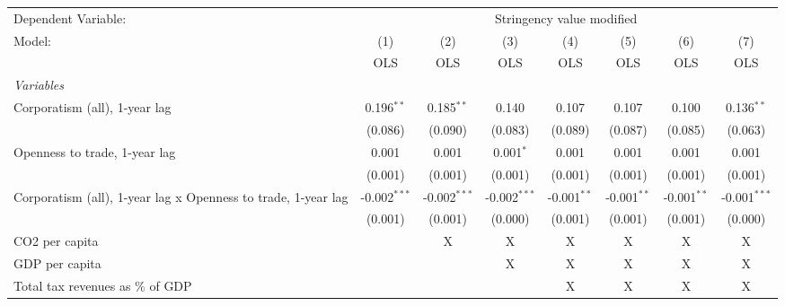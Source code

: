 
\begingroup
\centering
\begin{tabular}{lccccccc}
   \toprule
   Dependent Variable: & \multicolumn{7}{c}{Stringency value modified}\\
   Model:                                                        & (1)            & (2)            & (3)            & (4)           & (5)           & (6)           & (7)\\  
                                                                 &  OLS           & OLS            & OLS            & OLS           & OLS           & OLS           & OLS\\  
   \midrule
   \emph{Variables}\\
   Corporatism (all), 1-year lag                                 & 0.196$^{**}$   & 0.185$^{**}$   & 0.140          & 0.107         & 0.107         & 0.100         & 0.136$^{**}$\\   
                                                                 & (0.086)        & (0.090)        & (0.083)        & (0.089)       & (0.087)       & (0.085)       & (0.063)\\   
   Openness to trade, 1-year lag                                 & 0.001          & 0.001          & 0.001$^{*}$    & 0.001         & 0.001         & 0.001         & 0.001\\   
                                                                 & (0.001)        & (0.001)        & (0.001)        & (0.001)       & (0.001)       & (0.001)       & (0.001)\\   
   Corporatism (all), 1-year lag x Openness to trade, 1-year lag & -0.002$^{***}$ & -0.002$^{***}$ & -0.002$^{***}$ & -0.001$^{**}$ & -0.001$^{**}$ & -0.001$^{**}$ & -0.001$^{***}$\\   
                                                                 & (0.001)        & (0.001)        & (0.000)        & (0.001)       & (0.001)       & (0.001)       & (0.000)\\   
   CO2 per capita                                                &                & X              & X              & X             & X             & X             & X\\  
   GDP per capita                                                &                &                & X              & X             & X             & X             & X\\  
   Total tax revenues as \% of GDP                               &                &                &                & X             & X             & X             & X\\  

\end{tabular}
